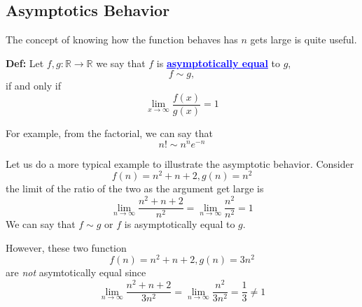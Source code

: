 \documentclass[a4paper, 12pt]{article}
\newcommand{\real}{\mathbb{R}}
\newcommand{\definition}{\vspace{1em}\noindent\textbf{Def:} }
\newcommand{\kwd}[1]{\textcolor{blue}{\textbf{\underline{#1}}}}
\begin{document}
\begin{multicols}{2}
\section*{Asymptotics Behavior}


The concept of knowing how the function behaves has $n$ gets large is quite useful.

\definition Let $f,g : \real \to \real$ we say that $f$ is \kwd{asymptotically equal} to $g$, 
\[
f \sim g,
\]
if and only if
\[
	\lim\limits_{x\to \infty} \frac{f(x)}{g(x)} = 1
\]

For example, from the factorial, we can say that
\[
	n! \sim n^n e^{-n}
\]

Let us do a more typical example to illustrate the asymptotic behavior. Consider
\[
	f(n) = n^2 +n +2, g(n) = n^2
\]
the limit of the ratio of the two as the argument get large is
\[
\lim\limits_{n\to \infty} \frac{n^2 +n + 2}{n^2} = \lim\limits_{n \to \infty} \frac{n^2}{n^2} = 1
\]
We can say that $f \sim g$ or $f$ is asymptotically equal to $g$.

However, these two function
\[
f(n) = n^2 +n +2, g(n) = 3 n^2
\]
are \emph{not} asymtotically equal since
\[
\lim\limits_{n\to \infty} \frac{n^2 +n + 2}{3n^2} = \lim\limits_{n \to \infty} \frac{n^2}{3n^2} = \frac{1}{3} \ne 1
\]
\end{multicols}
\end{document}
